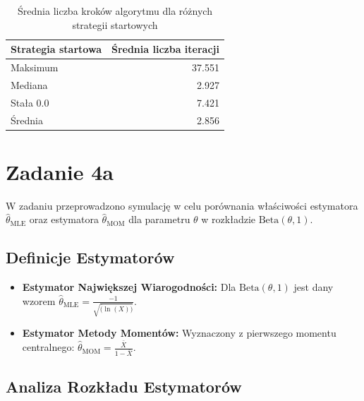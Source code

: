 \documentclass[a4paper,12pt]{article}
\begin{document}
    \datatable

    \begin{table}[h!]
        \centering
        \begin{tabular}{l r}
            \toprule
            Strategia startowa & Średnia liczba iteracji \\
            \midrule
            Maksimum   & 37.551 \\
            Mediana    & 2.927  \\
            Stała 0.0  & 7.421  \\
            Średnia    & 2.856  \\
            \bottomrule
        \end{tabular}
        \caption{Średnia liczba kroków algorytmu dla różnych strategii startowych}
    \end{table}

\newpage

\section{Zadanie 4a}

    W zadaniu przeprowadzono symulację w celu porównania właściwości estymatora $\hat{\theta}_{\text{MLE}}$ oraz estymatora $\hat{\theta}_{\text{MOM}}$
    dla parametru $\theta$ w rozkładzie $\text{Beta}(\theta, 1)$.

    \subsection{Definicje Estymatorów}

        \begin{itemize}
            \item \textbf{Estymator Największej Wiarogodności:} Dla $\text{Beta}(\theta, 1)$ jest dany wzorem $\hat{\theta}_{\text{MLE}} = \frac{-1}{\sqrt{\overline(\ln(X))}}$.
            \item \textbf{Estymator Metody Momentów:} Wyznaczony z pierwszego momentu centralnego: $\hat{\theta}_{\text{MOM}} = \frac{\bar{X}}{1 - \bar{X}}$.
        \end{itemize}

    \subsection{Analiza Rozkładu Estymatorów}
\end{document}
